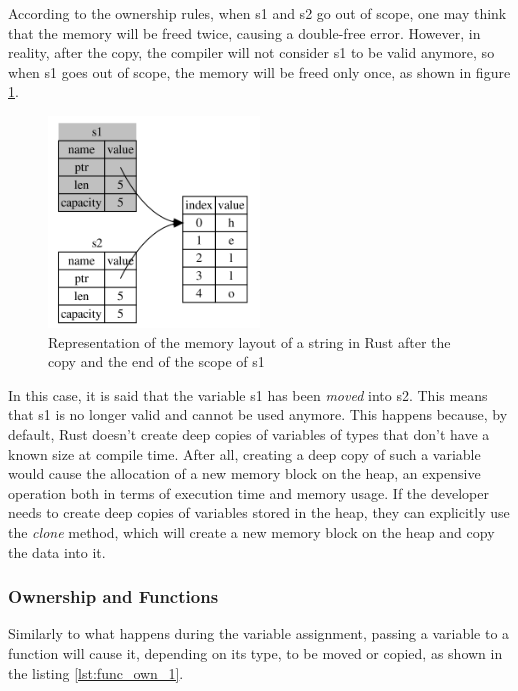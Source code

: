According to the ownership rules, when s1 and s2 go out of scope, one may think that the memory will be freed twice, causing a double-free error. However, in reality, after the copy, the compiler
will not consider s1 to be valid anymore, so when s1 goes out of scope, the memory will be freed only once, as shown in figure \ref{fig:string-memory-rep3}.

\begin{figure}[h]
    \centering
    \includegraphics[width=0.5\textwidth]{figures/string-memory-rep-3.png}
    \caption{Representation of the memory layout of a string in Rust after the copy and the end of the scope of s1}
    \label{fig:string-memory-rep3}
\end{figure}

In this case, it is said that the variable s1 has been \textit{moved} into s2. This means that s1 is no longer valid and cannot be used anymore.
This happens because, by default, Rust doesn't create deep copies of variables of types that don't have a known size at compile time. After all, creating a deep copy of such
a variable would cause the allocation of a new memory block on the heap, an expensive operation both in terms of execution time and memory usage. If the developer
needs to create deep copies of variables stored in the heap, they can explicitly use the \textit{clone} method, which will create a new memory block on the heap and copy the data into it.

\subsubsection{Ownership and Functions}
Similarly to what happens during the variable assignment, passing a variable to a function will cause it, depending on its type, to be moved or copied, as shown in the listing \ref{lst:func_own_1}.



